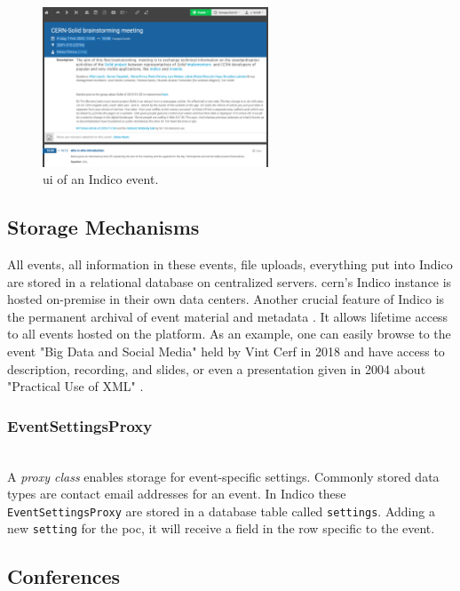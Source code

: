 \begin{figure}[H]
    \centering
    \includegraphics[width=0.6\textwidth]{thesis/latex/assets/indico-event-interface.png}
    \caption{\gls{ui} of an Indico event.}
    \label{fig:indico-event-interface}
\end{figure} 

\subsection{Storage Mechanisms}

All events, all information in these events, file uploads, everything put into Indico are stored in a relational database on centralized servers. \gls{cern}'s Indico instance is hosted on-premise in their own data centers. Another crucial feature of Indico is the permanent archival of event material and metadata \cite{cern-indico}. It allows lifetime access to all events hosted on the platform. As an example, one can easily browse to the event "Big Data and Social Media" held by Vint Cerf in 2018 \cite{vint-cerf} and have access to description, recording, and slides, or even a presentation given in 2004 about "Practical Use of XML" \cite{titov}.
\vspace{0.5cm}
\subsubsection{EventSettingsProxy}\mbox{}\\

A \textit{proxy class} enables storage for event-specific settings. Commonly stored data types are contact email addresses for an event. In Indico these \texttt{EventSettingsProxy} are stored in a database table called \texttt{settings}. Adding a new \texttt{setting} for the \gls{poc}, it will receive a field in the row specific to the event.

\subsection{Conferences}

